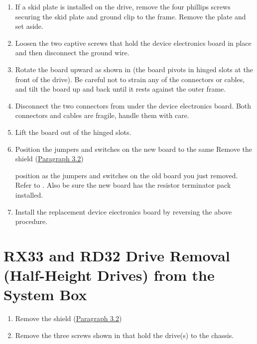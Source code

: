 \begin{enumerate}

\item	If a skid plate is installed on the drive, remove the four phillips screws
		securing the skid plate and ground clip to the frame. Remove the plate
		and set aside.

\item	Loosen the two captive screws that hold the device electronics board in
		place and then disconnect the ground wire.

\item	Rotate the board upward as shown in  (the board pivots in
		hinged slots at the front of the drive). Be careful not to strain any of
		the connectors or cables, and tilt the board up and back until it rests
		against the outer frame.



\item	Disconnect the two connectors from under the device electronics board.
		Both connectors and cables are fragile, handle them with care.

\item	Lift the board out of the hinged slots.

\newpage

\item	Position the jumpers and switches on the new board to the same 
Remove the shield (\hyperlink{section.3.2}{Paragraph 3.2})

		position as the jumpers and switches on the old board you just removed.
		Refer to . Also be sure the new board has the resistor 
		terminator pack installed.


\item	Install the replacement device eiectronics board by reversing the above procedure.

\end{enumerate}

\newpage

\section{RX33 and RD32 Drive Removal (Half-Height Drives) from the System Box}

\begin{enumerate}

\item	Remove the shield (\hyperlink{section.3.2}{Paragraph 3.2})

\item	Remove the three screws shown in  that hold the drive(s) to
		the chassis.

\newpage

\end{enumerate}
